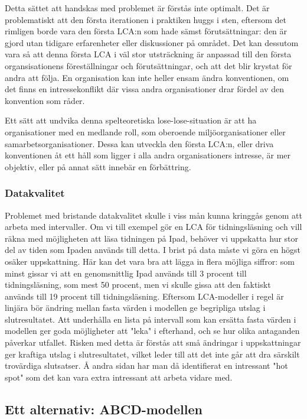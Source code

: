 \documentclass{article}
\begin{document}
Detta sättet att handskas med problemet är förstås inte optimalt. Det är problematiskt att den första iterationen i praktiken huggs i sten, eftersom det rimligen borde vara den första LCA:n som hade sämst förutsättningar: den är gjord utan tidigare erfarenheter eller diskussioner på området. Det kan dessutom vara så att denna första LCA i väl stor utsträckning är anpassad till den första organsisationens föreställningar och förutsättningar, och att det blir krystat för andra att följa. En organisation kan inte heller ensam ändra konventionen, om det finns en intressekonflikt där vissa andra organisationer drar fördel av den konvention som råder.

Ett sätt att undvika denna spelteoretiska lose-lose-situation är att ha organisationer med en medlande roll, som oberoende miljöorganisationer eller samarbetsorganisationer. Dessa kan utveckla den första LCA:n, eller driva konventionen åt ett håll som ligger i alla andra organisationers intresse, är mer objektiv, eller på annat sätt innebär en förbättring.

\subsubsection{Datakvalitet}

Problemet med bristande datakvalitet skulle i viss mån kunna kringgås genom att arbeta med intervaller. Om vi till exempel gör en LCA för tidningsläsning och vill räkna med möjligheten att läsa tidningen på Ipad, behöver vi uppskatta hur stor del av tiden som Ipaden används till detta. I brist på data måste vi göra en högst osäker uppskattning. Här kan det vara bra att lägga in flera möjliga siffror: som minst gissar vi att en genomsnittlig Ipad används till 3 procent till tidningsläsning, som mest 50 procent, men vi skulle gissa att den faktiskt används till 19 procent till tidningsläsning. Eftersom LCA-modeller i regel är linjära bör ändring mellan fasta värden i modellen ge begripliga utslag i slutresultatet. Att underhålla en lista på intervall som kan ersätta fasta värden i modellen ger goda möjligheter att "leka" i efterhand, och se hur olika antaganden påverkar utfallet. Risken med detta är förstås att små ändringar i uppskattningar ger kraftiga utslag i slutresultatet, vilket leder till att det inte går att dra särskilt trovärdiga slutsatser. Å andra sidan har man då identifierat en intressant "hot spot" som det kan vara extra intressant att arbeta vidare med.

\subsection{Ett alternativ: ABCD-modellen}
\end{document}
